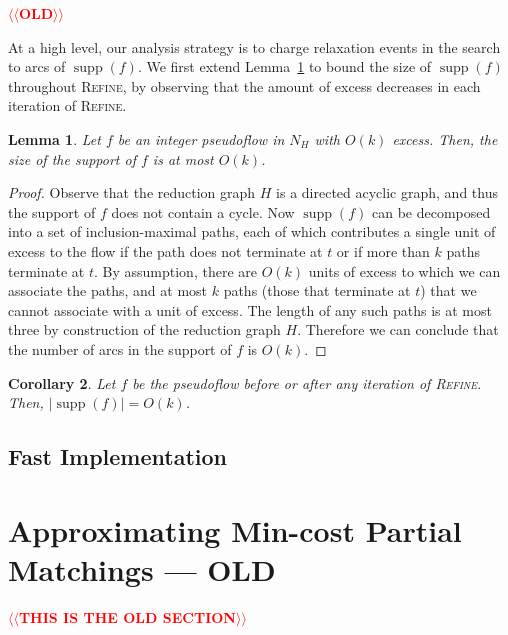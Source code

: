 \documentclass[11pt]{article}
\makeatletter
\def\supp{\operatorname{supp}}
\theoremstyle{plain}
\newtheorem{lemma}{Lemma}[section]
\newtheorem{corollary}[lemma]{Corollary}
\numberwithin{figure}{section}
\def\n@te#1{\textsf{\boldmath \textbf{$\langle\!\langle$#1$\rangle\!\rangle$}}\leavevmode}
\def\note#1{\textcolor{red}{\n@te{#1}}}
\makeatother
\begin{document}
\note{OLD}

At a high level, our analysis strategy is to charge relaxation events in
the search to arcs of $\supp(f)$.
We first extend Lemma~\ref{lemma:reduction_count} to bound the size of
$\supp(f)$ throughout \textsc{Refine}, by observing that the amount of excess
decreases in each iteration of \textsc{Refine}.


\begin{lemma}
\label{lemma:reduction_count}
Let $f$ be an integer pseudoflow in $N_H$ with $O(k)$ excess.
Then, the size of the support of $f$ is at most $O(k)$.
\end{lemma}

\begin{proof}
Observe that the reduction graph $H$ is a directed acyclic graph, and thus the support of $f$ does not contain a cycle.
Now $\supp(f)$ can be decomposed into a set of inclusion-maximal paths,
each of which contributes a single unit of excess to the flow if the path does not terminate at $t$ or if more than $k$ paths terminate at $t$.
By assumption, there are $O(k)$ units of excess to which we can associate the
paths, and at most $k$ paths (those that terminate at $t$) that we cannot associate with a unit of excess.
The length of any such paths is at most  three by construction of the reduction graph $H$.
Therefore we can conclude that the number of arcs in the support of $f$ is $O(k)$.
\end{proof}

\begin{corollary}
\label{corollary:support_size_during}
Let $f$ be the pseudoflow before or after any iteration of \textsc{Refine}.
Then, $|\supp(f)| = O(k)$.
\end{corollary}



\subsection{Fast Implementation}




\section{Approximating Min-cost Partial Matchings --- OLD}
\label{section:goldberg}

\note{THIS IS THE OLD SECTION}
\end{document}
